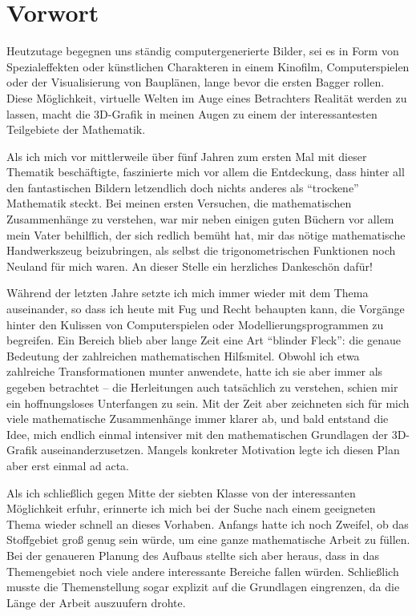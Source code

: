 \chapter*{Vorwort}

Heutzutage begegnen uns ständig computergenerierte Bilder, sei es in Form von Spezialeffekten oder künstlichen Charakteren in einem Kinofilm, Computerspielen oder der Visualisierung von Bauplänen, lange bevor die ersten Bagger rollen. Diese Möglichkeit, virtuelle Welten im Auge eines Betrachters Realität werden zu lassen, macht die 3D-Grafik in meinen Augen zu einem der interessantesten Teilgebiete der Mathematik.

Als ich mich vor mittlerweile über fünf Jahren zum ersten Mal mit dieser Thematik beschäftigte, faszinierte mich vor allem die Entdeckung, dass hinter all den fantastischen Bildern letzendlich doch nichts anderes als \enquote{trockene} Mathematik steckt. Bei meinen ersten Versuchen, die mathematischen Zusammenhänge zu verstehen, war mir neben einigen guten Büchern vor allem mein Vater behilflich, der sich redlich bemüht hat, mir das nötige mathematische Handwerkszeug beizubringen, als selbst die trigonometrischen Funktionen noch Neuland für mich waren. An dieser Stelle ein herzliches Dankeschön dafür!

Während der letzten Jahre setzte ich mich immer wieder mit dem Thema auseinander, so dass ich heute mit Fug und Recht behaupten kann, die Vorgänge hinter den Kulissen von Computerspielen oder Modellierungsprogrammen zu begreifen. Ein Bereich blieb aber lange Zeit eine Art \enquote{blinder Fleck}: die genaue Bedeutung der zahlreichen mathematischen Hilfsmitel. Obwohl ich etwa zahlreiche Transformationen munter anwendete, hatte ich sie aber immer als gegeben betrachtet -- die Herleitungen auch tatsächlich zu verstehen, schien mir ein hoffnungsloses Unterfangen zu sein. Mit der Zeit aber zeichneten sich für mich viele mathematische Zusammenhänge immer klarer ab, und bald entstand die Idee, mich endlich einmal intensiver mit den mathematischen Grundlagen der 3D-Grafik auseinanderzusetzen. Mangels konkreter Motivation legte ich diesen Plan aber erst einmal ad acta.

Als ich schließlich gegen Mitte der siebten Klasse von der interessanten Möglichkeit erfuhr, erinnerte ich mich bei der Suche nach einem geeigneten Thema wieder schnell an dieses Vorhaben. Anfangs hatte ich noch Zweifel, ob das Stoffgebiet groß genug sein würde, um eine ganze mathematische Arbeit zu füllen. Bei der genaueren Planung des Aufbaus stellte sich aber heraus, dass in das Themengebiet noch viele andere interessante Bereiche fallen würden. Schließlich musste die Themenstellung sogar explizit auf die Grundlagen eingrenzen, da die Länge der Arbeit auszuufern drohte. \missing

